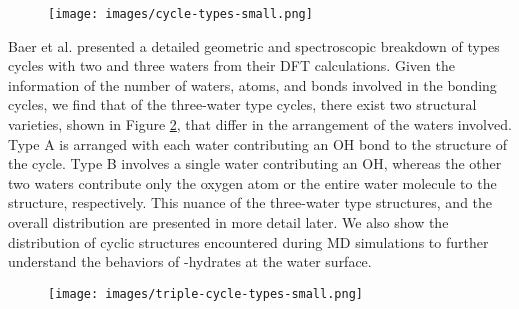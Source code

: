 \begin{figure}[h!]
	\begin{center}
		\texttt{[image: images/cycle-types-small.png]}
		\caption{}
		\label{fig:cyclic-structures}
	\end{center}
\end{figure}

Baer et al. presented a detailed geometric and spectroscopic breakdown of types  cycles with two and three waters from their DFT calculations.\cite{Baer2010} Given the information of the number of waters, atoms, and bonds involved in the bonding cycles, we find that of the three-water type  cycles, there exist two structural varieties, shown in Figure \ref{fig:type-3-varieties}, that differ in the arrangement of the waters involved. Type A is arranged with each water contributing an OH bond to the structure of the cycle. Type B involves a single water contributing an OH, whereas the other two waters contribute only the oxygen atom or the entire water molecule to the structure, respectively. This nuance of the three-water type  structures, and the overall distribution are presented in more detail later. We also show the distribution of cyclic structures encountered during MD simulations to further understand the behaviors of \suldiox-hydrates at the water surface.

\begin{figure}[h!]
	\begin{center}
		\texttt{[image: images/triple-cycle-types-small.png]}
		\caption{}
		\label{fig:type-3-varieties}
	\end{center}
\end{figure}
